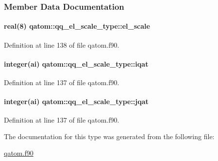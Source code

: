 \subsubsection{Member Data Documentation}
\hypertarget{structqatom_1_1qq__el__scale__type_af62199192e0366f4e52f2b55e4504343}{
\paragraph[{el\-\_\-scale}]{\setlength{\rightskip}{0pt plus 5cm}real(8) qatom\-::qq\-\_\-el\-\_\-scale\-\_\-type\-::el\-\_\-scale}}\label{structqatom_1_1qq__el__scale__type_af62199192e0366f4e52f2b55e4504343}


Definition at line 138 of file qatom.\-f90.

\hypertarget{structqatom_1_1qq__el__scale__type_ae9849b0bff78348841463201eb858efd}{
\paragraph[{iqat}]{\setlength{\rightskip}{0pt plus 5cm}integer(ai) qatom\-::qq\-\_\-el\-\_\-scale\-\_\-type\-::iqat}}\label{structqatom_1_1qq__el__scale__type_ae9849b0bff78348841463201eb858efd}


Definition at line 137 of file qatom.\-f90.

\hypertarget{structqatom_1_1qq__el__scale__type_abb300c45db069338246c6f6a3ac5a8e8}{
\paragraph[{jqat}]{\setlength{\rightskip}{0pt plus 5cm}integer(ai) qatom\-::qq\-\_\-el\-\_\-scale\-\_\-type\-::jqat}}\label{structqatom_1_1qq__el__scale__type_abb300c45db069338246c6f6a3ac5a8e8}


Definition at line 137 of file qatom.\-f90.



The documentation for this type was generated from the following file\-:\begin{DoxyCompactItemize}
\item 
\hyperlink{qatom_8f90}{qatom.\-f90}\end{DoxyCompactItemize}
